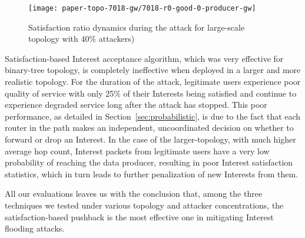 %

\begin{figure}[tbh]
 \centering
 \texttt{[image: paper-topo-7018-gw/7018-r0-good-0-producer-gw]}
 \vspace{-.3cm}\caption{Satisfaction ratio dynamics during the attack for large-scale topology with 40\% attackers)}\vspace{-.3cm}
 \label{fig:large-scale}
\end{figure}

Satisfaction-based Interest acceptance algorithm, which was very effective for binary-tree topology, is completely ineffective when deployed in a larger and more realistic topology. For the duration of the attack, legitimate users experience poor quality of service with only 25\% of their Interests being satisfied and continue to experience degraded service long after the attack has stopped. This poor performance, as detailed in Section~\ref{sec:probabilistic}, is due to the fact that each router in the path makes an independent, uncoordinated decision on whether to forward or drop an Interest. In the case of the larger-topology, with much higher average hop count, Interest packets from legitimate users have a very low probability of reaching the data producer, resulting in poor Interest satisfaction statistics, which in turn leads to further penalization of new Interests from them.

All our evaluations leaves us with the conclusion that, among the three techniques we tested under various topology and attacker concentrations, the satisfaction-based pushback is the most effective one in mitigating Interest flooding attacks.%


